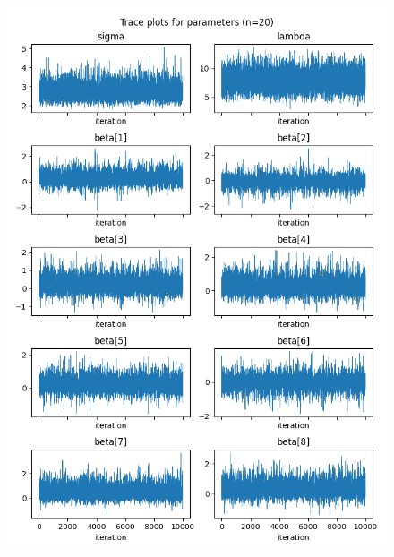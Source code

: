 \documentclass[a4paper, 10pt]{article}
\begin{document}
\begin{figure}[htb]
    \begin{center}
        \includegraphics[height=.4\textheight]{../outputs/artificial_scenarios_n=20/scenario_2/traceplots.png}

\end{center}
\end{figure}
\end{document}

